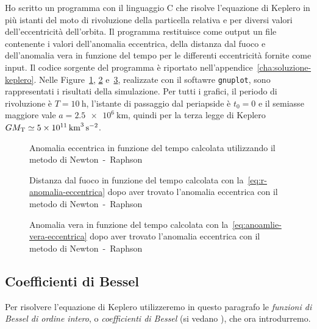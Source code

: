 Ho scritto un programma con il linguaggio C che risolve l'equazione di Keplero
in più istanti del moto di rivoluzione della particella relativa e per diversi
valori dell'eccentricità dell'orbita. Il programma restituisce come output un
file contenente i valori dell'anomalia eccentrica, della distanza dal fuoco e
dell'anomalia vera in funzione del tempo per le differenti eccentricità fornite
come input. Il codice sorgente del programma è riportato
nell'appendice~\ref{cha:soluzione-keplero}. Nelle
Figure~\ref{fig:newton-anomalia_eccentrica}, \ref{fig:newton-raggio}
e~\ref{fig:newton-anomalia_vera}, realizzate con il softawre \verb|gnuplot|,
sono rappresentati i risultati della simulazione. Per tutti i grafici, il
periodo di rivoluzione è $T = \SI{10}{\hour}$, l'istante di passaggio dal
periapside è $t_0 = 0$ e il semiasse maggiore vale $a =
\SI{2.5e6}{\kilo\metre}$,
quindi per la terza legge di Keplero
$GM_\textup{T} \simeq \SI{5e11}{\cubic\kilo\metre\per\square\second}$.
\begin{figure}
  \centering
  
  \caption[Anomalia eccentrica in funzione del tempo con il metodo di
  Newton~-~Raphson]{Anomalia eccentrica in funzione del tempo calcolata
    utilizzando il metodo di Newton~-~Raphson}
  \label{fig:newton-anomalia_eccentrica}
\end{figure}
\begin{figure}
  \centering
  
  \caption[Distanza dal fuoco in funzione del tempo con il metodo di
  Newton~-~Raphson]{Distanza dal fuoco in funzione del tempo calcolata con
    la~\eqref{eq:r-anomalia-eccentrica} dopo aver trovato l'anomalia eccentrica
    con il metodo di Newton~-~Raphson}
  \label{fig:newton-raggio}
\end{figure}
\begin{figure}
  \centering
  
  \caption[Anomalia vera in funzione del tempo con il metodo di
  Newton~-~Raphson]{Anomalia vera in funzione del tempo calcolata con
    la~\eqref{eq:anoamlie-vera-eccentrica} dopo aver trovato l'anomalia
    eccentrica con il metodo di Newton~-~Raphson}
  \label{fig:newton-anomalia_vera}
\end{figure}

\subsection{Coefficienti di Bessel}
\label{sec:bessel}

Per risolvere l'equazione di Keplero utilizzeremo in questo paragrafo le
\emph{funzioni di Bessel di ordine intero}, o \emph{coefficienti di
  Bessel} (si vedano \textcites{abramowitz:handbook}{watson:bessel}%
{whittaker:modern-analysis}), che ora introdurremo.

